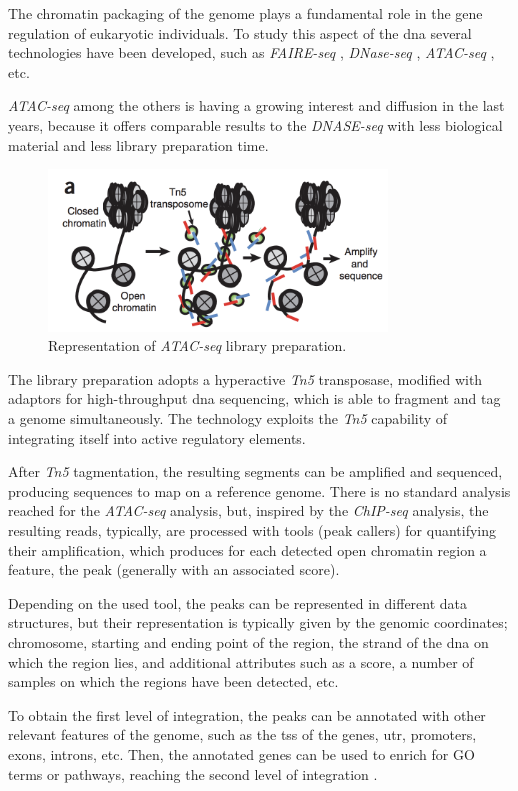 The chromatin packaging of the genome plays a fundamental role in the gene regulation of eukaryotic individuals.
To study this aspect of the \gls{dna} several technologies have been developed, such as \textit{FAIRE-seq} \cite{Giresi2007}, \textit{DNase-seq} \cite{Winter2013}, \textit{ATAC-seq} \cite{Buenrostro2013}, etc.

\textit{ATAC-seq} among the others is having a growing interest and diffusion in the last years, because it offers comparable results to the \textit{DNASE-seq} with less biological material and less library preparation time.

\begin{figure}[h]
\centering
\includegraphics[width=9cm,keepaspectratio]{img/intro/atac.png}
\caption[ATAC-seq experiment]{Representation of \textit{ATAC-seq }library preparation. \cite{Buenrostro2013}}
\label{fig:atacseqexp}
\end{figure}

The library preparation adopts a hyperactive \textit{Tn5} transposase, modified with adaptors for high-throughput  \gls{dna} sequencing, which is able to fragment and tag a genome simultaneously.
The technology exploits the \textit{Tn5} capability of integrating itself into active regulatory elements.

After \textit{Tn5} tagmentation, the resulting segments can be amplified and sequenced, producing sequences to map on a reference genome.
There is no standard analysis reached for the \textit{ATAC-seq} analysis, but, inspired by the \textit{ChIP-seq} analysis, the resulting reads, typically, are processed with tools (peak callers) for quantifying their amplification, which produces for each detected open chromatin region a feature, the peak (generally with an associated score). 

Depending on the used tool, the peaks can be represented in different data structures, but their representation is typically given by the genomic coordinates; chromosome, starting and ending point of the region, the strand of the \gls{dna} on which the region lies, and additional attributes such as a score, a number of samples on which the regions have been detected, etc.

To obtain the first level of integration, the peaks can be annotated with other relevant features of the genome, such as the \gls{tss} of the genes, \gls{utr}, promoters, exons, introns, etc.  
Then, the annotated genes can be used to enrich for GO terms or pathways, reaching the second level of integration \cite{righelli2018, Koberstein2018, Ou2018}.




